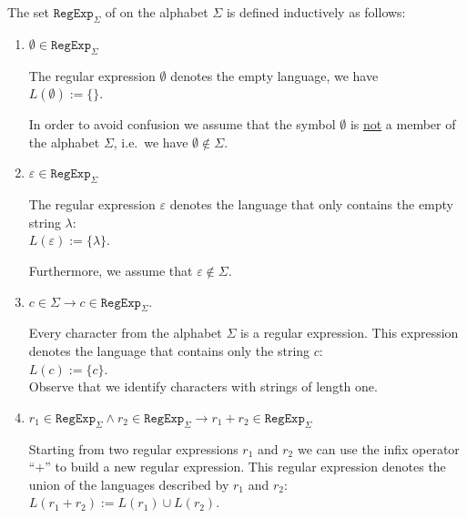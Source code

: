 \begin{Definition}
  The set \( \texttt{RegExp}_\Sigma \) of  on the alphabet \( \Sigma \) is defined inductively as follows:
  \begin{enumerate}
  \item $\emptyset \in \texttt{RegExp}_\Sigma$ \index{$\emptyset$}

        The regular expression $\emptyset$ denotes the empty language, we have
        \\[0.2cm]
        \hspace*{1.3cm}
        $L(\emptyset) := \{\}$.

        In order to avoid confusion we assume that the symbol $\emptyset$ is \underline{not} a member of the
        alphabet $\Sigma$, i.e.~we have $\emptyset \not\in \Sigma$.
  \item $\varepsilon \in \texttt{RegExp}_\Sigma$ \index{$\varepsilon$}

        The regular expression $\varepsilon$ denotes the language that only contains the empty
        string $\lambda$: 
        \\[0.2cm]
        \hspace*{1.3cm}
        $L(\varepsilon) := \{ \lambda \}$.

        Furthermore, we assume that $\varepsilon \not\in \Sigma$.
  \item $c \in \Sigma \rightarrow c \in \texttt{RegExp}_\Sigma$.

        Every character from the alphabet $\Sigma$ is a regular expression.  This expression denotes
        the language that contains only the string $c$:
        \\[0.2cm]
        \hspace*{1.3cm}
        $L(c) := \{ c \}$.
        \\[0.2cm]
        Observe that we identify characters with strings of length one.
  \item $r_1 \in \texttt{RegExp}_\Sigma \wedge r_2 \in \texttt{RegExp}_\Sigma
         \rightarrow r_1 + r_2 \in \texttt{RegExp}_\Sigma$

        Starting from two regular expressions $r_1$ and $r_2$ we can use the  infix operator
        ``$+$'' to build a new regular expression.  This regular expression denotes the union of 
        the languages described by $r_1$ and $r_2$:
        \\[0.2cm]
        \hspace*{1.3cm}
        $L(r_1 + r_2) := L(r_1) \cup L(r_2)$.


\end{enumerate}
\end{Definition}
